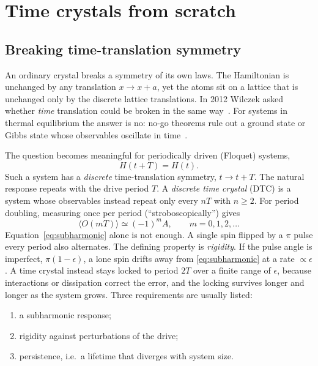 \documentclass[11pt,a4paper]{article}
\newcommand{\ev}[1]{\langle #1\rangle}
\begin{document}
\section{Time crystals from scratch}\label{sec:tc}

\subsection{Breaking time-translation symmetry}

An ordinary crystal breaks a symmetry of its own laws. The Hamiltonian is unchanged by any
translation $x\to x+a$, yet the atoms sit on a lattice that is unchanged only by the discrete
lattice translations. In 2012 Wilczek asked whether \emph{time} translation could be broken in
the same way~\cite{wilczek2012}. For systems in thermal equilibrium the answer is no: no-go
theorems rule out a ground state or Gibbs state whose observables oscillate in
time~\cite{bruno2013,watanabe2015}.

The question becomes meaningful for periodically driven (Floquet) systems,
\begin{equation}
H(t+T)=H(t).
\end{equation}
Such a system has a \emph{discrete} time-translation symmetry, $t\to t+T$. The natural
response repeats with the drive period $T$. A \emph{discrete time crystal} (DTC) is a system
whose observables instead repeat only every $nT$ with $n\ge2$. For period doubling, measuring
once per period (``stroboscopically'') gives
\begin{equation}
\ev{O(mT)} \simeq (-1)^m A,\qquad m=0,1,2,\dots
\label{eq:subharmonic}
\end{equation}
Equation~\eqref{eq:subharmonic} alone is not enough. A single spin flipped by a $\pi$ pulse
every period also alternates. The defining property is \emph{rigidity}. If the pulse angle is
imperfect, $\pi(1-\epsilon)$, a lone spin drifts away from \eqref{eq:subharmonic} at a rate
$\propto\epsilon$. A time crystal instead stays locked to period $2T$ over a finite range of
$\epsilon$, because interactions or dissipation correct the error, and the locking survives
longer and longer as the system grows. Three requirements are usually listed:
\begin{enumerate}[label=(\roman*)]
\item a subharmonic response;
\item rigidity against perturbations of the drive;
\item persistence, i.e.\ a lifetime that diverges with system size.
\end{enumerate}
\end{document}
